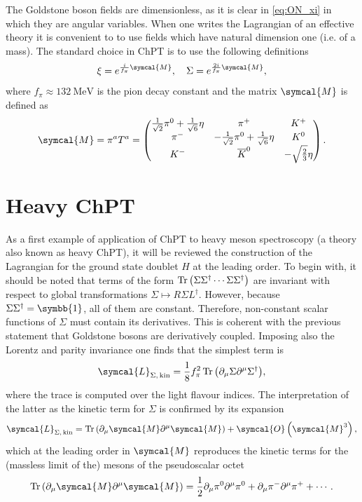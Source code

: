 The Goldstone boson fields are dimensionless, as it is clear in \eqref{eq:ON_xi} in which they are angular variables. When one writes the Lagrangian of an effective theory it is convenient to to use fields which have natural dimension one (i.e. of a mass). The standard choice in ChPT is to use the following definitions
\begin{equation}
  \xi = e^{\frac{i}{f_\pi}\symcal{M}}, \quad \Sigma = e^{\frac{2 i}{f_\pi} \symcal{M}} ,
\end{equation}
where $f_\pi \approx 132 \ \text{MeV}$ is the pion decay constant and the matrix $\symcal{M}$ is defined as
\begin{equation}
  \symcal{M} = \pi^a T^a = 
  \begin{pmatrix}
    \frac{1}{\sqrt{2}} \pi^0 + \frac{1}{\sqrt{6}} \eta & \pi^+ & K^+ \\
    \pi^- & - \frac{1}{\sqrt{2}} \pi^0 +  \frac{1}{\sqrt{6}} \eta & K^0 \\
    K^- & \adj{K}^0 & - \sqrt{\frac{2}{3}} \eta
  \end{pmatrix} .
\end{equation}

\section{Heavy ChPT}
\label{sec:heavy_ChPT}

As a first example of application of ChPT to heavy meson spectroscopy (a theory also known as heavy ChPT), it will be reviewed the construction of the Lagrangian for the ground state doublet $H$ at the leading order. To begin with, it should be noted that terms of the form $\operatorname{Tr}{\left( \Sigma \Sigma^\dagger \cdots \Sigma \Sigma^\dagger \right)}$ are invariant with respect to global transformations $\Sigma \mapsto R \Sigma L^\dagger$. However, because $\Sigma \Sigma^\dagger = \symbb{1}$, all of them are constant. Therefore, non-constant scalar functions of $\Sigma$ must contain its derivatives. This is coherent with the previous statement that Goldstone bosons are derivatively coupled. Imposing also the Lorentz and parity invariance one finds that the simplest term is
\begin{equation}
  \symcal{L}_{\Sigma, \, \text{kin}} = \frac{1}{8} f^2_\pi \tr{\left( \partial_\mu \Sigma \partial^\mu \Sigma^\dagger \right)} ,
  \label{eq:sigma_kinetic_lagrangian}
\end{equation}
where the trace is computed over the light flavour indices. The interpretation of the latter as the kinetic term for $\Sigma$ is confirmed by its expansion
\begin{equation}
  \symcal{L}_{\Sigma, \, \text{kin}} = \tr{\left( \partial_\mu \symcal{M} \partial^\mu \symcal{M} \right)} + \symcal{O} \left( \symcal{M}^3 \right),
\end{equation}
which at the leading order in $\symcal{M}$ reproduces the kinetic terms for the (massless limit of the) mesons of the pseudoscalar octet 
\begin{equation}
  \tr{\left( \partial_\mu \symcal{M} \partial^\mu \symcal{M} \right)} = \frac{1}{2} \partial_\mu \pi^0 \partial^\mu \pi^0 + \partial_\mu \pi^- \partial^\mu \pi^+ + \cdots .
\end{equation}

